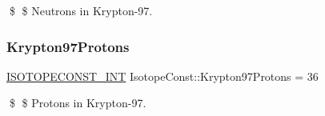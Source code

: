 \$ \$ Neutrons in Krypton-\/97. \mbox{\label{group___isotope_const-_krypton-_kr97_gaf1a4855741ecbda8f91f43e7d4ae4191}} 
\subsubsection{\texorpdfstring{Krypton97\+Protons}{Krypton97Protons}}
{\footnotesize\ttfamily \mbox{\hyperlink{group___isotope_const-_macros_ga5f18360b3e99483a35c32d789e62621c}{I\+S\+O\+T\+O\+P\+E\+C\+O\+N\+S\+T\+\_\+\+I\+NT}} Isotope\+Const\+::\+Krypton97\+Protons = 36}

\$ \$ Protons in Krypton-\/97. 